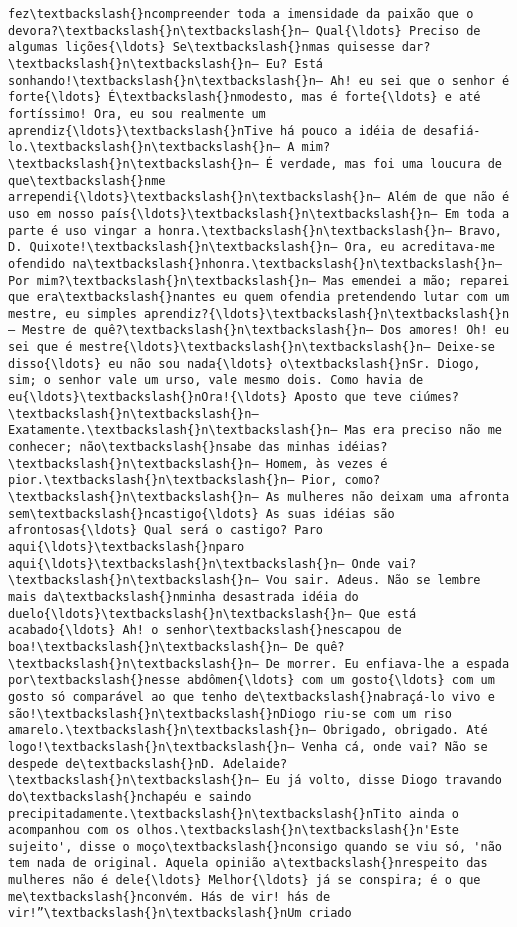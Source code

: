 \documentclass[11pt]{article}
\begin{document}
\begin{Verbatim}[commandchars=\\\{\}]
fez\textbackslash{}ncompreender toda a imensidade da paixão que o devora?\textbackslash{}n\textbackslash{}n— Qual{\ldots} Preciso de algumas lições{\ldots} Se\textbackslash{}nmas quisesse dar?\textbackslash{}n\textbackslash{}n— Eu? Está sonhando!\textbackslash{}n\textbackslash{}n— Ah! eu sei que o senhor é forte{\ldots} É\textbackslash{}nmodesto, mas é forte{\ldots} e até fortíssimo! Ora, eu sou realmente um aprendiz{\ldots}\textbackslash{}nTive há pouco a idéia de desafiá-lo.\textbackslash{}n\textbackslash{}n— A mim?\textbackslash{}n\textbackslash{}n— É verdade, mas foi uma loucura de que\textbackslash{}nme arrependi{\ldots}\textbackslash{}n\textbackslash{}n— Além de que não é uso em nosso país{\ldots}\textbackslash{}n\textbackslash{}n— Em toda a parte é uso vingar a honra.\textbackslash{}n\textbackslash{}n— Bravo, D. Quixote!\textbackslash{}n\textbackslash{}n— Ora, eu acreditava-me ofendido na\textbackslash{}nhonra.\textbackslash{}n\textbackslash{}n— Por mim?\textbackslash{}n\textbackslash{}n— Mas emendei a mão; reparei que era\textbackslash{}nantes eu quem ofendia pretendendo lutar com um mestre, eu simples aprendiz?{\ldots}\textbackslash{}n\textbackslash{}n— Mestre de quê?\textbackslash{}n\textbackslash{}n— Dos amores! Oh! eu sei que é mestre{\ldots}\textbackslash{}n\textbackslash{}n— Deixe-se disso{\ldots} eu não sou nada{\ldots} o\textbackslash{}nSr. Diogo, sim; o senhor vale um urso, vale mesmo dois. Como havia de eu{\ldots}\textbackslash{}nOra!{\ldots} Aposto que teve ciúmes?\textbackslash{}n\textbackslash{}n— Exatamente.\textbackslash{}n\textbackslash{}n— Mas era preciso não me conhecer; não\textbackslash{}nsabe das minhas idéias?\textbackslash{}n\textbackslash{}n— Homem, às vezes é pior.\textbackslash{}n\textbackslash{}n— Pior, como?\textbackslash{}n\textbackslash{}n— As mulheres não deixam uma afronta sem\textbackslash{}ncastigo{\ldots} As suas idéias são afrontosas{\ldots} Qual será o castigo? Paro aqui{\ldots}\textbackslash{}nparo aqui{\ldots}\textbackslash{}n\textbackslash{}n— Onde vai?\textbackslash{}n\textbackslash{}n— Vou sair. Adeus. Não se lembre mais da\textbackslash{}nminha desastrada idéia do duelo{\ldots}\textbackslash{}n\textbackslash{}n— Que está acabado{\ldots} Ah! o senhor\textbackslash{}nescapou de boa!\textbackslash{}n\textbackslash{}n— De quê?\textbackslash{}n\textbackslash{}n— De morrer. Eu enfiava-lhe a espada por\textbackslash{}nesse abdômen{\ldots} com um gosto{\ldots} com um gosto só comparável ao que tenho de\textbackslash{}nabraçá-lo vivo e são!\textbackslash{}n\textbackslash{}nDiogo riu-se com um riso amarelo.\textbackslash{}n\textbackslash{}n— Obrigado, obrigado. Até logo!\textbackslash{}n\textbackslash{}n— Venha cá, onde vai? Não se despede de\textbackslash{}nD. Adelaide?\textbackslash{}n\textbackslash{}n— Eu já volto, disse Diogo travando do\textbackslash{}nchapéu e saindo precipitadamente.\textbackslash{}n\textbackslash{}nTito ainda o acompanhou com os olhos.\textbackslash{}n\textbackslash{}n'Este sujeito', disse o moço\textbackslash{}nconsigo quando se viu só, 'não tem nada de original. Aquela opinião a\textbackslash{}nrespeito das mulheres não é dele{\ldots} Melhor{\ldots} já se conspira; é o que me\textbackslash{}nconvém. Hás de vir! hás de vir!”\textbackslash{}n\textbackslash{}nUm criado 
\end{Verbatim}
\end{document}
